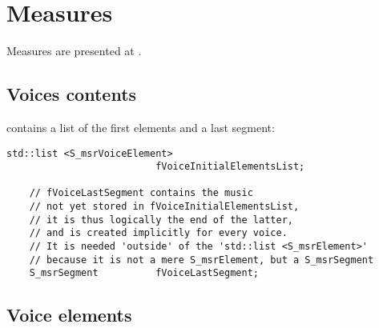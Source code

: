 



\chapter{Measures}\label{Measures}

Measures are presented at .


\section{Voices contents}

 contains a list of the first elements and a last segment:
\begin{lstlisting}[language=CPlusPlus]
    std::list <S_msrVoiceElement>
                          fVoiceInitialElementsList;

    // fVoiceLastSegment contains the music
    // not yet stored in fVoiceInitialElementsList,
    // it is thus logically the end of the latter,
    // and is created implicitly for every voice.
    // It is needed 'outside' of the 'std::list <S_msrElement>'
    // because it is not a mere S_msrElement, but a S_msrSegment
    S_msrSegment          fVoiceLastSegment;
\end{lstlisting}


\section{Voice elements}

